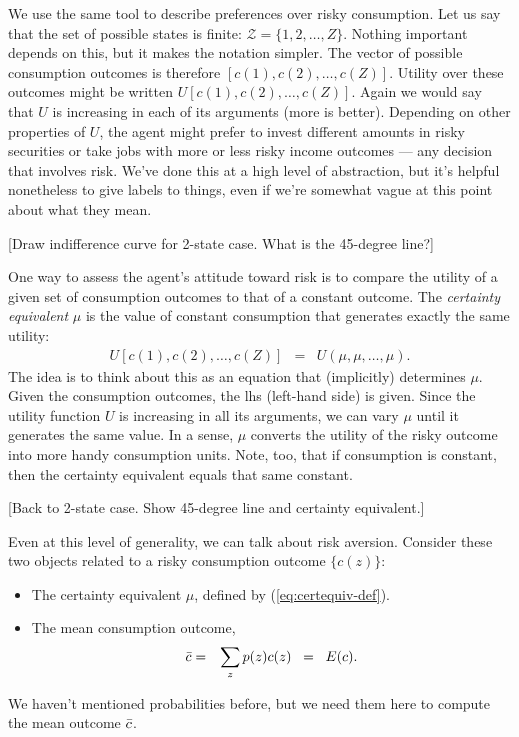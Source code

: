 \documentclass[11pt]{article}
\begin{document}
We use the same tool to describe preferences
over risky consumption.
Let us say that the set of possible states is finite:
$ \mathcal{Z} = \{ 1, 2, \ldots, Z \}$.
Nothing important depends on this, but it makes the notation simpler.
The vector of possible consumption outcomes is therefore
$[c(1), c(2), \ldots, c(Z)]$.
Utility over these outcomes might be written
$U [c(1), c(2), \ldots, c(Z)]$.
Again we would say that $U$ is increasing in each of its arguments
(more is better).
Depending on other properties of $U$,
the agent might prefer to invest different amounts in
risky securities or take jobs with more or less risky income outcomes ---
any decision that involves risk.
We've done this at a high level of abstraction,
but it's helpful nonetheless to give labels to things,
even if we're somewhat vague at this point about what they mean.

[Draw indifference curve for 2-state case. What is the 45-degree line?]

One way to assess the agent's attitude toward risk
is to compare the utility of a given set of consumption outcomes
to that of a constant outcome.
The {\it certainty equivalent\/} $\mu$
is the value of constant consumption
that generates exactly the same utility:
\begin{eqnarray}
    U [c(1), c(2), \ldots, c(Z)]
            &=& U (\mu, \mu, \ldots, \mu ) .
    \label{eq:certequiv-def}
\end{eqnarray}
The idea is to think about this as an equation that (implicitly) determines $\mu$.
Given the consumption outcomes, the lhs (left-hand side) is given.
Since the utility function $U$ is increasing in all its arguments,
we can vary $\mu$ until it generates the same value.
In a sense, $\mu$ converts the utility of the risky outcome
into more handy consumption units.
Note, too, that if consumption is constant, then the certainty
equivalent equals that same constant.

[Back to 2-state case.
Show 45-degree line and certainty equivalent.]

Even at this level of generality, we can talk about risk aversion.
Consider these two objects related to a risky consumption
outcome $\{ c(z)\}$:
%
\begin{itemize}
\item The certainty equivalent $\mu$, defined by (\ref{eq:certequiv-def}).

\item The mean consumption outcome,
\begin{eqnarray*}
    \bar{c} &=& \sum_z p(z) c(z) \;\;=\;\; E(c) .
\end{eqnarray*}
\end{itemize}
We haven't mentioned probabilities before, but we need them here to
compute the mean outcome $\bar{c}$.
\end{document}
